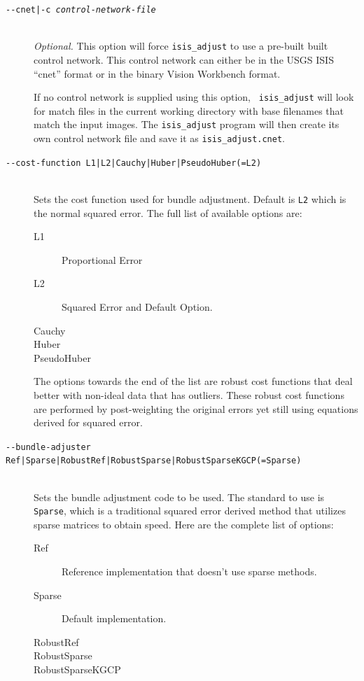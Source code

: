 \begin{description}

\item[\texttt{-\/-cnet|-c \textit{control-network-file}}] \hfill \\
  \emph{Optional.} This option will force {\tt isis\_adjust} to
  use a pre-built built control network. This control network can
  either be in the \ac{USGS} \ac{ISIS} ``cnet'' format or in the binary Vision
  Workbench format.

  If no control network is supplied using this option, {\tt
    isis\_adjust} will look for match files in the current working
  directory with base filenames that match the input images.  The
  \texttt{isis\_adjust} program will then create its own control
  network file and save it as \texttt{isis\_adjust.cnet}.

\item[\texttt{-\/-cost-function L1|L2|Cauchy|Huber|PseudoHuber(=L2)} ] \hfill \\
  Sets the cost function used for bundle adjustment. Default is \texttt{L2}
  which is the normal squared error. The full list of available options
  are:

  \begin{description}
    \item[L1] Proportional Error
    \item[L2] Squared Error and Default Option.
    \item[Cauchy]
    \item[Huber]
    \item[PseudoHuber]
  \end{description}

  The options towards the end of the list are robust cost functions
  that deal better with non-ideal data that has outliers. These robust
  cost functions are performed by post-weighting the original errors yet
  still using equations derived for squared error.

\item[\texttt{-\/-bundle-adjuster Ref|Sparse|RobustRef|RobustSparse|RobustSparseKGCP(=Sparse)}] \hfill \\
  Sets the bundle adjustment code to be used. The standard to use is
  \texttt{Sparse}, which is a traditional squared error derived method that
  utilizes sparse matrices to obtain speed. Here are the complete list
  of options:

  \begin{description}
    \item[Ref] Reference implementation that doesn't use sparse methods.
    \item[Sparse] Default implementation.
    \item[RobustRef]
    \item[RobustSparse]
    \item[RobustSparseKGCP]
  \end{description}


\end{description}

